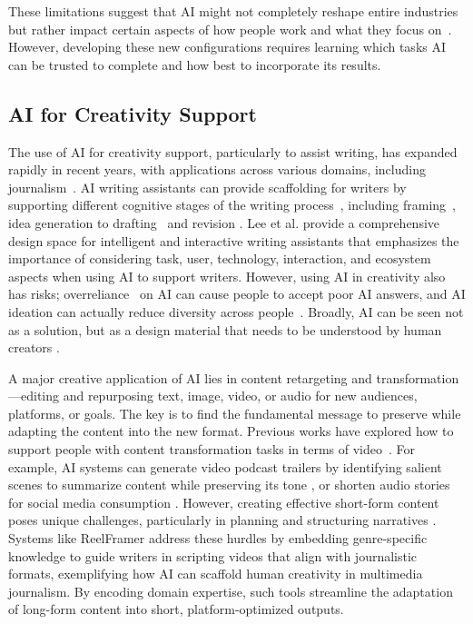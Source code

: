 These limitations suggest that AI might not completely reshape entire industries but rather impact certain aspects of how people work and what they focus on~\cite{randazzo2024cyborgs}. 
However, developing these new configurations requires learning which tasks AI can be trusted to complete and how best to incorporate its results.


\subsection{AI for Creativity Support}

The use of AI for creativity support, particularly to assist writing, has expanded rapidly in recent years, with applications across various domains, including journalism~\cite{opal,reelframer,anglekindling}. 
AI writing assistants can provide scaffolding for writers by supporting different cognitive stages of the writing process~\cite{flower1981cognitive}, including framing~\cite{hui2023lettersmith, reelframer}, idea generation \cite{clark2018creative, anglekindling} to drafting~\cite{sparks, VISAR,tweetorial_hook} and revision \cite{lee2024design, sparks, wu2019design}. 
Lee et al. \cite{lee2024design} provide a comprehensive design space for intelligent and interactive writing assistants that emphasizes the importance of considering task, user, technology, interaction, and ecosystem aspects when using AI to support writers. 
However, using AI in creativity also has risks; overreliance~\cite{overreliance_ibm, overreliance_facct, overreliance_examples, overreliance_difficulty} on AI can cause people to accept poor AI answers, and AI ideation can actually reduce diversity across people~\cite{kreminski_homogenity}.
Broadly, AI can be seen not as a solution, but as a design material that needs to be understood by human creators \cite{ai_design_material_CHI22, eytan_design_material}.

A major creative application of AI lies in content retargeting and transformation—editing and repurposing text, image, video, or audio for new audiences, platforms, or goals.
The key is to find the fundamental message to preserve while adapting the content into the new format.
Previous works have explored how to support people with content transformation tasks in terms of video~\cite{truong2021automatic,chi2021automatic,chi2022synthesis,podreels,Rope_wang}.
For example, AI systems can generate video podcast trailers by identifying salient scenes to summarize content while preserving its tone \cite{podreels}, or shorten audio stories for social media consumption \cite{Rope_wang}. 
However, creating effective short-form content poses unique challenges, particularly in planning and structuring narratives \cite{kim2024unlocking}. 
Systems like ReelFramer \cite{reelframer} address these hurdles by embedding genre-specific knowledge to guide writers in scripting videos that align with journalistic formats, exemplifying how AI can scaffold human creativity in multimedia journalism. 
By encoding domain expertise, such tools streamline the adaptation of long-form content into short, platform-optimized outputs.

